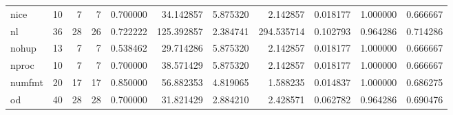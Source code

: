 \begin{longtable}{lrrrrrrrrrr}
nice      &                                      10 &                  7 &                                 7 &                                   0.700000 &                              34.142857 &                                     5.875320 &                          2.142857 &                                0.018177 &                           1.000000 &                                           0.666667 \\
nl        &                                      36 &                 28 &                                26 &                                   0.722222 &                             125.392857 &                                     2.384741 &                        294.535714 &                                0.102793 &                           0.964286 &                                           0.714286 \\
nohup     &                                      13 &                  7 &                                 7 &                                   0.538462 &                              29.714286 &                                     5.875320 &                          2.142857 &                                0.018177 &                           1.000000 &                                           0.666667 \\
nproc     &                                      10 &                  7 &                                 7 &                                   0.700000 &                              38.571429 &                                     5.875320 &                          2.142857 &                                0.018177 &                           1.000000 &                                           0.666667 \\
numfmt    &                                      20 &                 17 &                                17 &                                   0.850000 &                              56.882353 &                                     4.819065 &                          1.588235 &                                0.014837 &                           1.000000 &                                           0.686275 \\
od        &                                      40 &                 28 &                                28 &                                   0.700000 &                              31.821429 &                                     2.884210 &                          2.428571 &                                0.062782 &                           0.964286 &                                           0.690476 \\

\end{longtable}
